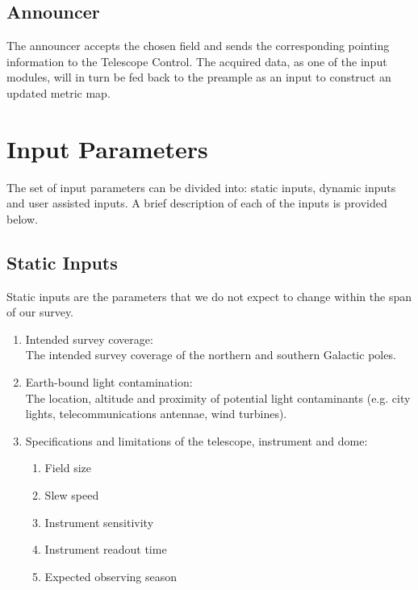 \documentclass{article}
\begin{document}
\subsection{Announcer}
The announcer accepts the chosen field and sends the corresponding pointing information to the Telescope Control. The acquired data, as one of the input modules, will in turn be fed back to the preample as an input to construct an updated metric map.

\section{Input Parameters}\label{sec:ins}
The set of input parameters can be divided into: static inputs, dynamic inputs and user assisted inputs. A brief description of each of the inputs is provided below.

\subsection{Static Inputs}
Static inputs are the parameters that we do not expect to change within the span of our survey.
\begin{enumerate}
\item Intended survey coverage: \\
The intended survey coverage of the northern and southern Galactic poles.

\item Earth-bound light contamination: \\
The location, altitude and proximity of potential light contaminants (e.g. city lights, telecommunications antennae, wind turbines).

\item Specifications and limitations of the telescope, instrument and dome:
\begin{enumerate}
	\item Field size
	\item Slew speed
	\item Instrument sensitivity
	\item Instrument readout time
	\item Expected observing season
\end{enumerate}
\end{enumerate}
\end{document}
